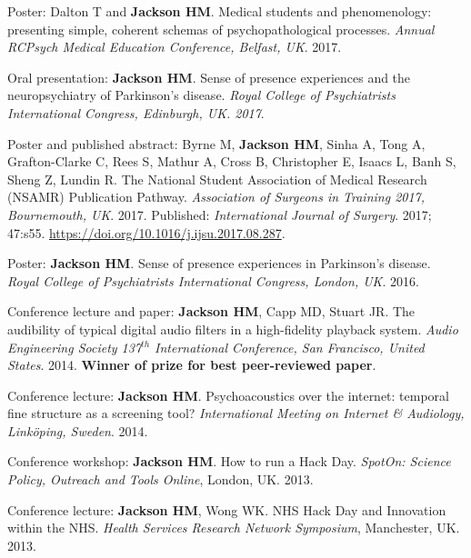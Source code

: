 \documentclass[a4paper, oneside, final, 11pt]{scrartcl} %
\begin{document}
\bigskip

Poster: Dalton T and \textbf{Jackson HM}. Medical students and phenomenology: presenting simple, coherent schemas of psychopathological processes. \textit{Annual RCPsych Medical Education Conference, Belfast, UK}. 2017.

\bigskip

Oral presentation: \textbf{Jackson HM}. Sense of presence experiences and the neuropsychiatry of Parkinson's disease. \textit{Royal College of Psychiatrists International Congress, Edinburgh, UK. 2017}.

\bigskip

Poster and published abstract: Byrne M, \textbf{Jackson HM}, Sinha A, Tong A, Grafton-Clarke C, Rees S, Mathur A, Cross B, Christopher E, Isaacs L, Banh S, Sheng Z, Lundin R. The National Student Association of Medical Research (NSAMR) Publication Pathway. \textit{Association of Surgeons in Training 2017, Bournemouth, UK}. 2017. Published: \textit{International Journal of Surgery}. 2017; 47:s55. \url{https://doi.org/10.1016/j.ijsu.2017.08.287}.

\bigskip

Poster: \textbf{Jackson HM}. Sense of presence experiences in Parkinson's disease. \textit{Royal College of Psychiatrists International Congress, London, UK}. 2016.

\bigskip

Conference lecture and paper: \textbf{Jackson HM}, Capp MD, Stuart JR. The audibility of typical digital audio filters in a high-fidelity playback system. \textit{Audio Engineering Society 137$^{th}$ International Conference, San Francisco, United States}. 2014. \textbf{Winner of prize for best peer-reviewed paper}.

\bigskip

Conference lecture: \textbf{Jackson HM}. Psychoacoustics over the internet: temporal fine structure as a screening tool? \textit{International Meeting on Internet \& Audiology, Link{\"o}ping, Sweden}. 2014.

\bigskip

Conference workshop: \textbf{Jackson HM}. How to run a Hack Day. \textit{SpotOn: Science Policy, Outreach and Tools Online}, London, UK. 2013.

\bigskip

Conference lecture: \textbf{Jackson HM}, Wong WK. NHS Hack Day and Innovation within the NHS. \textit{Health Services Research Network Symposium}, Manchester, UK. 2013.
\end{document}
